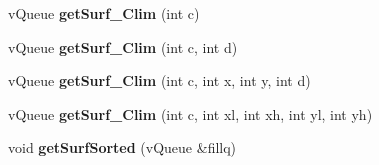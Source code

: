 \begin{DoxyCompactItemize}
v\+Queue {\bfseries get\+Surf\+\_\+\+Clim} (int c)
\item 
\mbox{\label{classev_1_1vSurface2_af9e9a30828d508f49921b02224723a36}} 
v\+Queue {\bfseries get\+Surf\+\_\+\+Clim} (int c, int d)
\item 
\mbox{\label{classev_1_1vSurface2_a708416f0ae3b13858f1c96e203898223}} 
v\+Queue {\bfseries get\+Surf\+\_\+\+Clim} (int c, int x, int y, int d)
\item 
\mbox{\label{classev_1_1vSurface2_a1b04ff8d8d449b054a514c092bac1145}} 
v\+Queue {\bfseries get\+Surf\+\_\+\+Clim} (int c, int xl, int xh, int yl, int yh)
\item 
\mbox{\label{classev_1_1vSurface2_aacd14a2e5c73e557b7b6b90a20624e23}} 
void {\bfseries get\+Surf\+Sorted} (v\+Queue \&fillq)
\end{DoxyCompactItemize}

